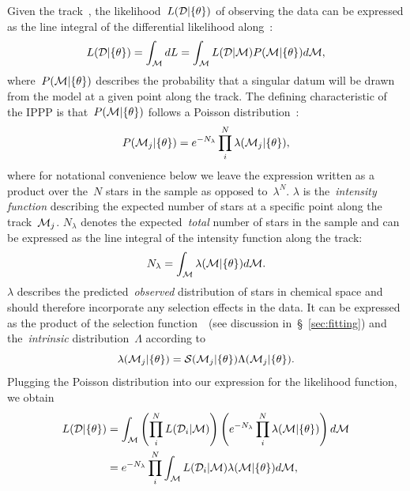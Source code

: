 \documentclass[foo.tex]{subfiles}
\begin{document}
\par
Given the track~, the likelihood~$L(\mathcal{D} | \{\theta\})$ of
observing the data can be expressed as the line integral of the differential
likelihood along~:
\begin{equation}
L(\mathcal{D} | \{\theta\}) = \int_{\mathcal{M}} dL =
\int_{\mathcal{M}} L(\mathcal{D} | \mathcal{M}) P(\mathcal{M} | \{\theta\})
d\mathcal{M},
\end{equation}
where~$P(\mathcal{M} | \{\theta\})$ describes the probability that a singular
datum will be drawn from the model at a given point along the track.
The defining characteristic of the IPPP is that~$P(\mathcal{M} | \{\theta\})$
follows a Poisson distribution~\citep{Press2007}:
\begin{equation}
P(\mathcal{M}_j | \{\theta\}) = e^{-N_\lambda}
\prod_i^N \lambda (\mathcal{M}_j | \{\theta\}),
\end{equation}
where for notational convenience below we leave the expression written as a
product over the~$N$ stars in the sample as opposed to~$\lambda^N$.
$\lambda$ is the~\textit{intensity function} describing the expected
number of stars at a specific point along the track~$\mathcal{M}_j$.
$N_\lambda$ denotes the expected~\textit{total} number of stars in the sample
and can be expressed as the line integral of the intensity function along the
track:
\begin{equation}
N_\lambda = \int_{\mathcal{M}} \lambda(\mathcal{M} | \{\theta\}) d\mathcal{M}.
\end{equation}
$\lambda$ describes the predicted~\textit{observed} distribution of stars in
chemical space and should therefore incorporate any selection effects in the
data.
It can be expressed as the product of the selection function~~(see
discussion in~\S~\ref{sec:fitting}) and the~\textit{intrinsic}
distribution~$\Lambda$ according to
\begin{equation}
\lambda(\mathcal{M}_j | \{\theta\}) = \mathcal{S}(\mathcal{M}_j | \{\theta\})
\Lambda(\mathcal{M}_j | \{\theta\}).
\end{equation}
Plugging the Poisson distribution into our expression for the likelihood
function, we obtain
\begin{subequations}\begin{align}
L(\mathcal{D} | \{\theta\}) &= \int_{\mathcal{M}}
\left(\prod_i^N L(\mathcal{D}_i | \mathcal{M})\right)
\left(e^{-N_\lambda} \prod_i^N \lambda(\mathcal{M} | \{\theta\})\right)
d\mathcal{M}
\\
&= e^{-N_\lambda} \prod_i^N \int_{\mathcal{M}} L(\mathcal{D}_i | \mathcal{M})
\lambda(\mathcal{M} | \{\theta\}) d\mathcal{M},
\end{align}\end{subequations}
\end{document}
